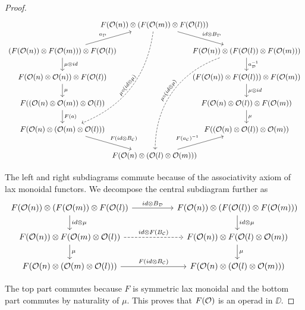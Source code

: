 \documentclass[Thesis.tex]{subfiles}
\begin{document}
\begin{proof}
   \[
\begin{tikzcd}[column sep = -3em]
 & F(\OO(n))\otimes (F(\OO(m))\otimes F(\OO(l)))\arrow[dr, "id\otimes B_\DD"]\arrow[ddddl, dashed, bend left = 30, sloped, "\mu\circ (id\otimes\mu)"]& \\
(F(\OO(n))\otimes F(\OO(m)))\otimes F(\OO(l))\arrow[d, "\mu\otimes id"]\arrow[ur, "a_\DD"] &  & F(\OO(n))\otimes (F(\OO(l))\otimes F(\OO(m)))\arrow[d, "a_\DD^{-1}"]\arrow[ddddl, dashed, bend right = 35, sloped, "\mu\circ (id\otimes\mu)"]\\
F(\OO(n)\otimes\OO(n))\otimes F(\OO(l))\arrow[d, "\mu"] & & (F(\OO(n))\otimes F(\OO(l)))\otimes F(\OO(m))\arrow[d, "\mu\otimes id"]\\
F((\OO(n)\otimes\OO(m))\otimes \OO(l))\arrow[d, "F(a)"] & & F(\OO(n)\otimes \OO(l))\otimes F(\OO(m))\arrow[d, "\mu"]\\
F(\OO(n)\otimes (\OO(m)\otimes\OO(l)))\arrow[dr,"F(id\otimes B_\CC)"] & & F((\OO(n)\otimes\OO(l))\otimes\OO(m))\\
& F(\OO(n)\otimes (\OO(l)\otimes\OO(m)))\arrow[ur, "F(a_\CC)^{-1}"]&
\end{tikzcd}  
   \]
   
   The left and right subdiagrams commute because of the associativity axiom of lax monoidal functors. We decompose the central subdiagram further as
   \[
\begin{tikzcd}[column sep = 5em]
F(\OO(n))\otimes (F(\OO(m))\otimes F(\OO(l))\arrow[r, "id\otimes B_\DD"]\arrow[d, "id\otimes \mu"] & F(\OO(n))\otimes (F(\OO(l))\otimes F(\OO(m)))\arrow[d, "id\otimes \mu"]\\
F(\OO(n))\otimes F(\OO(m)\otimes\OO(l))\arrow[r, dashed,  "id\otimes F(B_\CC)"]\arrow[d, "\mu"] & F(\OO(n))\otimes F(\OO(l)\otimes\OO(m))\arrow[d, "\mu"]\\
F(\OO(n)\otimes (\OO(m)\otimes\OO(l)))\arrow[r, "F(id\otimes B_\CC)"] & F(\OO(n)\otimes (\OO(l)\otimes \OO(m)))
\end{tikzcd}   
   \]
   
   The top part commutes because $F$ is symmetric lax monoidal and the bottom part commutes by naturality of $\mu$. This proves that $F({\mathcal O})$ is an operad in $\DD$. 
   

\end{proof}
\end{document}

